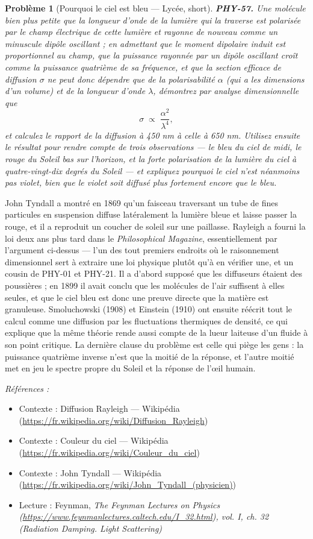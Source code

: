 \documentclass[11pt]{article}
\newtheorem{problem}{Problème}
\newenvironment{refs}{\par\small\noindent\emph{Références :}\begin{itemize}\setlength\itemsep{0pt}}{\end{itemize}\normalsize}
\begin{document}
\begin{problem}[{Pourquoi le ciel est bleu --- Lycée, short}]
\textbf{PHY-57.} Une molécule bien plus petite que la longueur d'onde de la
lumière qui la traverse est polarisée par le champ électrique de cette lumière et rayonne de nouveau
comme un minuscule dipôle oscillant ; en admettant que le moment dipolaire induit est proportionnel
au champ, que la puissance rayonnée par un dipôle oscillant croît comme la puissance quatrième de sa
fréquence, et que la section efficace de diffusion $ \sigma $ ne peut donc dépendre que de la
polarisabilité $ \alpha $ (qui a les dimensions d'un volume) et de la longueur d'onde
$ \lambda $, démontrez par analyse dimensionnelle que
\[ \sigma \;\propto\; \frac{\alpha^{2}}{\lambda^{4}}, \]
et calculez le rapport de la diffusion à 450 nm à celle à 650 nm. Utilisez ensuite le résultat pour
rendre compte de trois observations --- le bleu du ciel de midi, le rouge du Soleil bas sur l'horizon,
et la forte polarisation de la lumière du ciel à quatre-vingt-dix degrés du Soleil --- et expliquez
pourquoi le ciel n'est néanmoins pas violet, bien que le violet soit diffusé plus fortement encore
que le bleu.
\end{problem}

\noindent John Tyndall a montré en 1869 qu'un faisceau traversant un tube de fines
particules en suspension diffuse latéralement la lumière bleue et laisse passer la rouge, et il a
reproduit un coucher de soleil sur une paillasse. Rayleigh a fourni la loi deux ans plus tard dans le
\textit{Philosophical Magazine}, essentiellement par l'argument ci-dessus --- l'un des tout premiers
endroits où le raisonnement dimensionnel sert à extraire une loi physique plutôt qu'à en vérifier
une, et un cousin de PHY-01 et PHY-21. Il a d'abord supposé que les diffuseurs étaient des
poussières ; en 1899 il avait conclu que les molécules de l'air suffisent à elles seules, et que le
ciel bleu est donc une preuve directe que la matière est granuleuse. Smoluchowski (1908) et Einstein
(1910) ont ensuite réécrit tout le calcul comme une diffusion par les fluctuations thermiques de
densité, ce qui explique que la même théorie rende aussi compte de la lueur laiteuse d'un fluide à
son point critique. La dernière clause du problème est celle qui piège les gens : la puissance
quatrième inverse n'est que la moitié de la réponse, et l'autre moitié met en jeu le spectre propre
du Soleil et la réponse de l'\oe{}il humain.

\begin{refs}
\item Contexte : Diffusion Rayleigh --- Wikipédia (\url{https://fr.wikipedia.org/wiki/Diffusion_Rayleigh})
\item Contexte : Couleur du ciel --- Wikipédia (\url{https://fr.wikipedia.org/wiki/Couleur_du_ciel})
\item Contexte : John Tyndall --- Wikipédia (\url{https://fr.wikipedia.org/wiki/John_Tyndall_(physicien)})
\item Lecture : Feynman, \textit{The Feynman Lectures on Physics (\url{https://www.feynmanlectures.caltech.edu/I_32.html}), vol. I, ch. 32 (Radiation Damping. Light Scattering)}
\end{refs}
\end{document}
